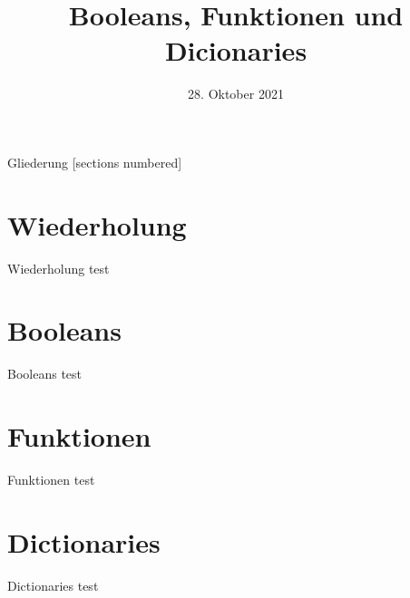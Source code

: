 



\title{Booleans, Funktionen und Dicionaries}
\date{28. Oktober 2021}

\usepackage{graphicx}


	
\maketitle

\begin{frame}{Gliederung}
	[sections numbered]
	\tableofcontents
\end{frame}


\section{Wiederholung}
\begin{frame}{Wiederholung}
	test
\end{frame}

\section{Booleans}
\begin{frame}{Booleans}
	test	
\end{frame}

\section{Funktionen}
\begin{frame}{Funktionen}
	test
\end{frame}

\section{Dictionaries}
\begin{frame}{Dictionaries}
	test
\end{frame}



